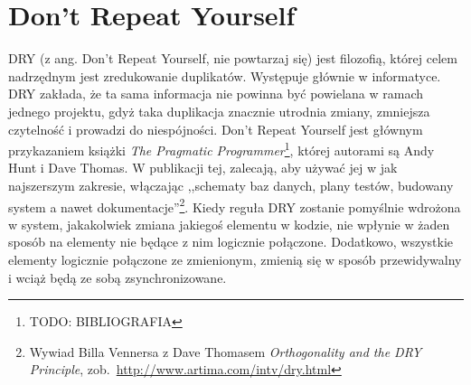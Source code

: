 \documentclass[a4paper,12pt,oneside]{report}
\begin{document}
\section{Don't Repeat Yourself}
\label{sec:dry}
DRY (z ang. Don't Repeat Yourself, nie powtarzaj się) jest filozofią, której celem nadrzędnym jest zredukowanie duplikatów. Występuje głównie w informatyce. DRY zakłada, że ta sama informacja nie powinna być powielana w ramach jednego projektu, gdyż taka duplikacja znacznie utrodnia zmiany, zmniejsza czytelność i prowadzi do niespójności. Don't Repeat Yourself jest głównym przykazaniem książki \emph{The Pragmatic Programmer}\footnote{TODO: BIBLIOGRAFIA}, której autorami są Andy Hunt i Dave Thomas. W publikacji tej, zalecają, aby używać jej w jak najszerszym zakresie, włączając ,,schematy baz danych, plany testów, budowany system a nawet dokumentacje''\footnote{Wywiad Billa Vennersa z Dave Thomasem \emph{Orthogonality and the DRY Principle}, zob.~\url{http://www.artima.com/intv/dry.html}}. Kiedy reguła DRY zostanie pomyślnie wdrożona w system, jakakolwiek zmiana jakiegoś elementu w kodzie, nie wpłynie w żaden sposób na elementy nie będące z nim logicznie połączone. Dodatkowo, wszystkie elementy logicznie połączone ze zmienionym, zmienią się w sposób przewidywalny i wciąż będą ze sobą zsynchronizowane.
\end{document}
